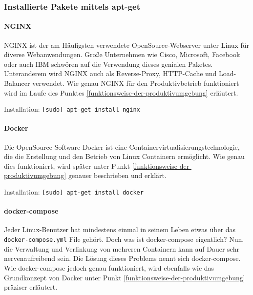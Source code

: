 \hypertarget{installierte-pakete-mittels-apt-get}{%
\subsubsection{Installierte Pakete mittels
apt-get}\label{installierte-pakete-mittels-apt-get}}

\hypertarget{nginx}{%
\paragraph{NGINX}\label{nginx}}

NGINX ist der am Häufigsten verwendete OpenSource-Webserver unter Linux
für diverse Webanwendungen. Große Unternehmen wie Cisco, Microsoft,
Facebook oder auch IBM schwören auf die Verwendung dieses genialen
Paketes. Unteranderem wird NGINX auch als Reverse-Proxy, HTTP-Cache und
Load-Balancer verwendet. Wie genau NGINX für den Produktivbetrieb
funktioniert wird im Laufe des Punktes
\ref{funktionsweise-der-produktivumgebung} erläutert.

Installation: \texttt{{[}sudo{]}\ apt-get\ install\ nginx}

\hypertarget{docker}{%
\paragraph{Docker}\label{docker}}

Die OpenSource-Software Docker ist eine
Containervirtualisierungstechnologie, die die Erstellung und den Betrieb
von Linux Containern ermöglicht. Wie genau dies funktioniert, wird
später unter Punkt \ref{funktionsweise-der-produktivumgebung} genauer
beschrieben und erklärt.

Installation: \texttt{{[}sudo{]}\ apt-get\ install\ docker}

\hypertarget{docker-compose}{%
\paragraph{docker-compose}\label{docker-compose}}

Jeder Linux-Benutzer hat mindestens einmal in seinem Leben etwas über
das \texttt{docker-compose.yml} File gehört. Doch was ist docker-compose
eigentlich? Nun, die Verwaltung und Verlinkung von mehreren Containern
kann auf Dauer sehr nervenaufreibend sein. Die Lösung dieses Problems
nennt sich docker-compose. Wie docker-compose jedoch genau funktioniert,
wird ebenfalls wie das Grundkonzept von Docker unter Punkt
\ref{funktionsweise-der-produktivumgebung} präziser erläutert.

